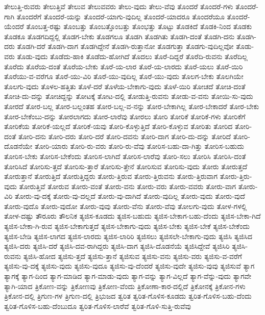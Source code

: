 {ತೇಲುತ್ತಿ-ರುವರು
ತೇಲುತ್ತಿವೆ
ತೇಲುವ
ತೇಲುವವರು
ತೇಲು-ವುದು
ತೇಲು-ವೆವು
ತೊಂದರೆ
ತೊಂದರೆ-ಗಳು
ತೊಂದರೆ-ಗಾಗಿ
ತೊಂದರೆಗೆ
ತೊಂದರೆ-ಯನ್ನು
ತೊಂದರೆ-ಯಾಗು-ವುದಿಲ್ಲ
ತೊಂದರೆ-ಯಾದರೂ
ತೊಂದರೆಯೂ
ತೊಂದರೆ-ಯೆಂದರೆ
ತೊಂಬತ್ತ-ರಷ್ಟು
ತೊಂಬತ್ತು
ತೊಂಬತ್ತೊಂಬತ್ತು
ತೊಂಭತ್ತು
ತೊಟ್ಟು
ತೊಡಕಿದೆ
ತೊಡಕಿ-ನಿಂದ
ತೊಡಕು
ತೊಡಕೂ
ತೊಡಗದಿದ್ದಲ್ಲಿ
ತೊಡಗ-ಬೇಕು
ತೊಡಗಲೂ
ತೊಡಗಿ
ತೊಡಗಿತು
ತೊಡಗಿ-ದಂತೆ
ತೊಡಗಿ-ದನು
ತೊಡಗಿ-ದರು
ತೊಡಗಿ-ದರೆ
ತೊಡಗಿ-ದಾಗ
ತೊಡಗಿದ್ದೇನೆ
ತೊಡಗಿ-ರುತ್ತಾನೋ
ತೊಡಗುತ್ತಾ
ತೊಡಗು-ವುದಿಲ್ಲವೋ
ತೊಡು-ವರು
ತೊಡು-ವುದು
ತೊಡೆದು-ಹಾಕಿ
ತೊಡೆದು-ಹೋಗಿದೆ
ತೊದಲು
ತೊರೆ-ದಿದ್ದರೆ
ತೊರೆದಿ-ರುವನು
ತೊರೆದಿಲ್ಲ
ತೊರೆದು
ತೊರೆಯ-ದಂತೆ
ತೊರೆಯ-ಬೇಕು
ತೊರೆ-ಯ-ಲಾರ
ತೊರೆ-ಯ-ಲಾರದು
ತೊರೆ-ಯಲು
ತೊರೆ-ಯಿರಿ
ತೊರೆಯು-ವ-ವರೆಗೂ
ತೊರೆ-ಯು-ವಿರಿ
ತೊರೆ-ಯು-ವುದಿಲ್ಲ
ತೊರೆ-ಯು-ವುದು
ತೊಲಗ-ಬೇಕು
ತೊಲಗಿಯೇ
ತೊಲಗು-ವುದು
ತೊಳಲ-ಹತ್ತಿತು
ತೊಳೆ-ದರೆ
ತೊಳೆಯ-ಬೇಕಾಗು-ವುದು
ತೊಳೆ-ಯಿರಿ
ತೋಚದೆ
ತೋಚಿ-ದಂತೆ
ತೋಚಿ-ದು-ದನ್ನು
ತೋಚಿದ್ದನ್ನು
ತೋಟಕ್ಕೆ
ತೋಟ-ದಲ್ಲಿ
ತೋಡುತ್ತಿ-ರುವನು
ತೋಡು-ವ-ವನು
ತೋಯಿ-ಸು-ವುದು
ತೋರದೆ
ತೋರ-ಬಲ್ಲ
ತೋರ-ಬಲ್ಲಂತಹ
ತೋರ-ಬಲ್ಲ-ವ-ನನ್ನು
ತೋರ-ಬೇಕಾಗಿಲ್ಲ
ತೋರ-ಬೇಕಾದರೆ
ತೋರ-ಬೇಕು
ತೋರ-ಬೇಕೆಂಬು-ದನ್ನು
ತೋರಲಾಗದು
ತೋರ-ಲಾರೆವು
ತೋರಲು
ತೋರಿ
ತೋರಿಕೆ
ತೋರಿಕೆ-ಗಳು
ತೋರಿಕೆಗೆ
ತೋರಿಕೆಯ
ತೋರಿಕೆ-ಯಲ್ಲದೆ
ತೋರಿಕೆ-ಯವು
ತೋರಿ-ಕೊಳ್ಳುತ್ತಿದೆ
ತೋರಿ-ಕೊಳ್ಳುವ
ತೋರಿತು
ತೋರಿದ
ತೋರಿ-ದಂತೆ
ತೋರಿ-ದನು
ತೋರಿ-ದರು
ತೋರಿ-ದರೆ
ತೋರಿ-ದವನು
ತೋರಿ-ದಾಗ
ತೋರಿ-ದು-ದನ್ನು
ತೋರಿದೆ
ತೋರಿ-ದೊಡನೆಯೇ
ತೋರಿ-ಯಾರು
ತೋರಿ-ರು-ವರು
ತೋರಿ-ರು-ವೆವು
ತೋರಿಸ-ಬಹು-ದಾ-ಗಿತ್ತು
ತೋರಿಸ-ಬಹುದು
ತೋರಿಸ-ಬೇಕು
ತೋರಿಸ-ಬೇಕೆಂದು
ತೋರಿಸ-ಲಾಗಿದೆ
ತೋರಿಸ-ಲಾರೆವು
ತೋರಿ-ಸಲು
ತೋರಿಸಿ
ತೋರಿಸಿ-ದಂತೆ
ತೋರಿಸಿದೆ
ತೋರಿಸು-ತ್ತದೆ
ತೋರಿಸು-ತ್ತಾರೆ
ತೋರಿಸು-ತ್ತೇನೆ
ತೋರಿಸುವ
ತೋರಿಸು-ವುದು
ತೋರು
ತೋರುತ್ತದೆ
ತೋರುತ್ತಾನೆ
ತೋರುತ್ತಿದೆ
ತೋರುತ್ತಿದ್ದರು
ತೋರು-ತ್ತಿರುವ
ತೋರು-ತ್ತಿರುವನು
ತೋರು-ತ್ತಿರುವಾಗ
ತೋರು-ತ್ತಿರು-ವುದು
ತೋರುತ್ತಿವೆ
ತೋರುವ
ತೋರು-ವಂತೆ
ತೋರು-ವನು
ತೋರು-ವರು
ತೋರು-ವವರು
ತೋರು-ವಾಗ
ತೋರು-ವಿರಿ
ತೋರು-ವು-ದಕ್ಕೆ
ತೋರು-ವು-ದಲ್ಲದೆ
ತೋರು-ವು-ದಾಗಿದೆ
ತೋರು-ವುದಿಲ್ಲ
ತೋರು-ವುದು
ತೋರು-ವುದೆ
ತೋರು-ವುದೊ
ತೋರು-ವುದೋ
ತೋರು-ವುವು
ತೋರು-ವೆನು
ತೋರು-ವೆವು
ತೋಲಗು-ವುದು
ತೋಳ-ಗಳಲ್ಲಿ
ತೋಳ-ದಷ್ಟು
ತೌರೂರು
ತೌಲನಿಕ
ತ್ಯಜಿಸ-ಕೂಡದು
ತ್ಯಜಿಸ-ಬಹುದು
ತ್ಯಜಿಸ-ಬೇಕಾಗ-ಬಹು-ದೆಂದು
ತ್ಯಜಿಸ-ಬೇಕಾ-ಗಿದೆ
ತ್ಯಜಿಸ-ಬೇಕಾ-ಗಿ-ರುವ
ತ್ಯಜಿಸ-ಬೇಕಾಗುತ್ತದೆ
ತ್ಯಜಿಸ-ಬೇಕಾಗು-ವುದು
ತ್ಯಜಿಸ-ಬೇಕು
ತ್ಯಜಿಸ-ಬೇಕೆ
ತ್ಯಜಿಸ-ಬೇಕೆಂದು
ತ್ಯಜಿಸ-ಬೇಡಿ
ತ್ಯಜಿಸ-ಲಾಗದ
ತ್ಯಜಿಸ-ಲಾರದು
ತ್ಯಜಿಸ-ಲಾರಿರಿ
ತ್ಯಜಿಸಲು
ತ್ಯಜಿಸಲೇ-ಬೇಕಾಗು-ವುದು
ತ್ಯಜಿಸಿ
ತ್ಯಜಿಸಿದ
ತ್ಯಜಿಸಿ-ದರು
ತ್ಯಜಿಸಿ-ದರೆ
ತ್ಯಜಿಸಿ-ದವ-ರಾಗಿದ್ದರು
ತ್ಯಜಿಸಿ-ದಾಗ
ತ್ಯಜಿಸಿ-ದೊಡನೆಯೆ
ತ್ಯಜಿಸಿದ್ದೇವೆ
ತ್ಯಜಿಸಿರಿ
ತ್ಯಜಿಸಿ-ರುವನು
ತ್ಯಜಿಸಿ-ಹೋದ
ತ್ಯಜಿಸು-ತ್ತದೆ
ತ್ಯಜಿಸು-ತ್ತಾನೆ
ತ್ಯಜಿಸುವ
ತ್ಯಜಿಸು-ವನು
ತ್ಯಜಿಸು-ವರು
ತ್ಯಜಿಸು-ವ-ವರೆಗೆ
ತ್ಯಜಿಸು-ವು-ದಕ್ಕೆ
ತ್ಯಜಿಸು-ವುದು
ತ್ಯಜಿಸು-ವುದೂ
ತ್ಯಜಿಸು-ವು-ದೆಂದರೆ
ತ್ಯಜಿಸು-ವುದೇ
ತ್ಯಜಿಸು-ವುವು
ತ್ಯಜಿಸುವೆ
ತ್ಯಾಗ
ತ್ಯಾಗಕ್ಕೆ
ತ್ಯಾಗ-ದಿಂದ
ತ್ಯಾಗ-ಮಾಡಿದ
ತ್ಯಾಗ-ಮಾಡು-ವುದು
ತ್ಯಾಗ-ವನ್ನು
ತ್ಯಾಗ-ವಿಲ್ಲದೆ
ತ್ಯಾಗ-ವೆನ್ನು-ವುದು
ತ್ಯಾಗವೇ
ತ್ಯಾಗಿ-ಯಾದ
ತ್ರಿಕೋಣ-ವನ್ನು
ತ್ರಿಕೋಣವು
ತ್ರಿಕೋಣ-ವೆಂದು
ತ್ರಿಕೋಣಾ-ಕಾರ-ದಲ್ಲಿದೆ
ತ್ರಿಕೋನಕ್ಕೆ
ತ್ರಿಕೋನ-ಗಳು
ತ್ರಿಕೋನ-ದಲ್ಲಿ
ತ್ರಿಗುಣ-ಗಳ
ತ್ರಿಗುಣ-ದಲ್ಲಿ
ತ್ರಿಭುಜದ
ತ್ವರಿತ
ತ್ವರಿತ-ಗೊಳಿಸ-ಕೂಡದು
ತ್ವರಿತ-ಗೊಳಿಸ-ಬಹು-ದೆಂದು
ತ್ವರಿತ-ಗೊಳಿಸ-ಬಹು-ದೆಂಬುದೂ
ತ್ವರಿತ-ಗೊಳಿಸ-ಲಾರೆವೆ
ತ್ವರಿತ-ಗೊಳಿ-ಸುತ್ತಿ-ರುವೆವು
}
